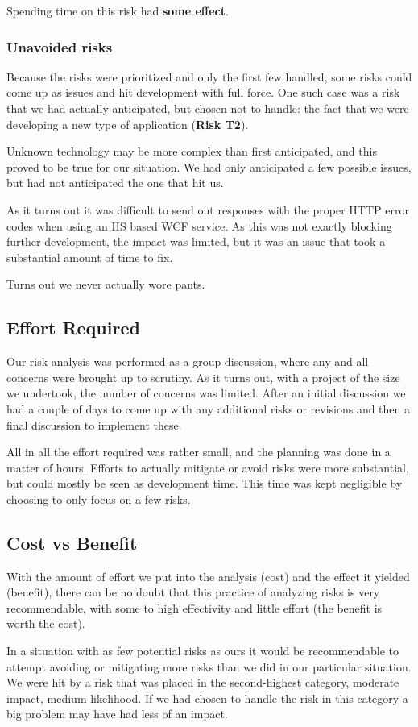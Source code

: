 Spending time on this risk had \textbf{some effect}.

\subsubsection{Unavoided risks}

Because the risks were prioritized and only the first few handled, some risks
could come up as issues and hit development with full force. One such case was a
risk that we had actually anticipated, but chosen not to handle: the fact that
we were developing a new type of application (\textbf{Risk T2}).

Unknown technology may be more complex than first anticipated, and this proved
to be true for our situation. We had only anticipated a few possible issues,
but had not anticipated the one that hit us.

As it turns out it was difficult to send out responses with the proper HTTP
error codes when using an IIS based WCF service. As this was not exactly
blocking further development, the impact was limited, but it was an issue that
took a substantial amount of time to fix.

Turns out we never actually wore pants.

\subsection{Effort Required}

Our risk analysis was performed as a group discussion, where any and all concerns were brought up to scrutiny.
As it turns out, with a project of the size we undertook, the number of concerns was limited. After an initial
discussion we had a couple of days to come up with any additional risks or revisions and then a final discussion
to implement these.

All in all the effort required was rather small, and the planning was done in a
matter of hours. Efforts to actually mitigate or avoid risks were more
substantial, but could mostly be seen as development time. This time was kept
negligible by choosing to only focus on a few risks.

\subsection{Cost vs Benefit}

With the amount of effort we put into the analysis (cost) and the effect it
yielded (benefit), there can be no doubt that this practice of analyzing risks
is very recommendable, with some to high effectivity and little effort (the
benefit is worth the cost).

In a situation with as few potential risks as ours it would be recommendable to
attempt avoiding or mitigating more risks than we did in our particular
situation. We were hit by a risk that was placed in the second-highest
category, moderate impact, medium likelihood. If we had chosen to handle the
risk in this category a big problem may have had less of an impact.
